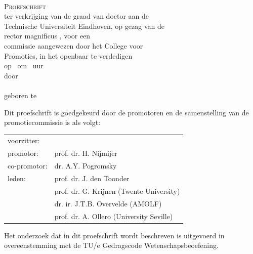 \vspace*{30mm}
\begin{center}
{\LARGE\sf\maintitle}\\[30mm] %
{\large\textsc{Proefschrift}}\\[8mm]
ter verkrijging van de graad van doctor aan de\\
Technische Universiteit Eindhoven, op gezag van de\\
rector magnificus \rector, voor een\\
commissie aangewezen door het College voor\\
Promoties, in het openbaar te verdedigen\\
op \ om \ uur\\[8mm]
door\\[8mm]
\@author\\[8mm]
geboren te \placeofbirth
\end{center}
\vfill

\newpage
\thispagestyle{empty}

\noindent
Dit proefschrift is goedgekeurd door de promotoren en de samenstelling van de promotiecommissie is als volgt:\\[7mm]

\noindent
\begin{tabular}{@{}l p{9.8cm}}
voorzitter:                 &                   \\
promotor:                   &   prof. dr. H. Nijmijer \\
co-promotor:                &   dr. A.Y. Pogromsky \\
leden:                      &   prof. dr. J. den Toonder \\
                            &   prof. dr. G. Krijnen (Twente University) \\
                            &   dr. ir. J.T.B. Overvelde (AMOLF) \\
                            &   prof. dr. A.  Ollero (University Seville) \\
\end{tabular}

\vfill
\noindent
Het onderzoek dat in dit proefschrift wordt beschreven is uitgevoerd in overeenstemming met de TU/e Gedragscode Wetenschapsbeoefening.
